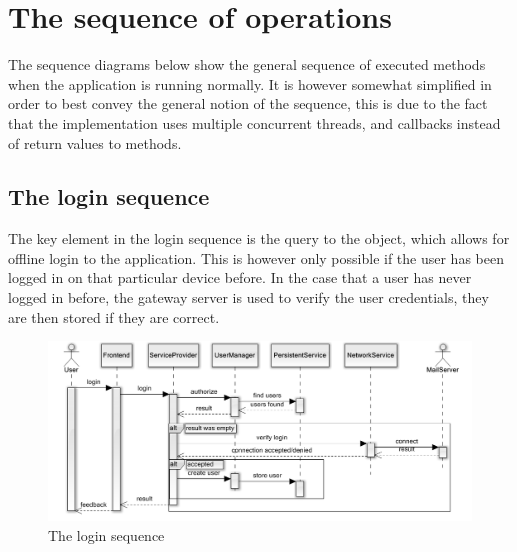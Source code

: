 \newpage

\section{The sequence of operations}
	The sequence diagrams below show the general sequence of executed methods when the application is running normally. It is however somewhat simplified in order to best convey the general notion of the sequence, this is due to the fact that the implementation uses multiple concurrent threads, and callbacks instead of return values to methods. 
	\subsection{The login sequence}
	The key element in the login sequence is the query to the  object, which allows for offline login to the application. This is however only possible if the user has been logged in on that particular device before. In the case that a user has never logged in before, the gateway server is used to verify the user credentials, they are then stored if they are correct. 
	\begin{figure}[H]
		\includegraphics[width=\textwidth]{LoginSequence}
		\caption{The login sequence}
		\label{fig:lifecycle}
	\end{figure}

\newpage
	
